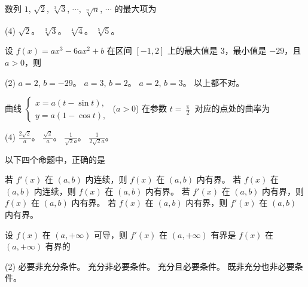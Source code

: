 \begin{ti}
	数列 $1$, $\sqrt{2}$, $\sqrt[3]{3}$, $\cdots$, $\sqrt[n]{n}$, $\cdots$ 的最大项为
	\begin{tasks}(4)
		\task $\sqrt{2}$。
		\task $\sqrt[3]{3}$。
		\task $\sqrt[4]{4}$。
		\task $\sqrt[5]{5}$。
	\end{tasks}
\end{ti}

\begin{ti}
	设 $f(x) = ax^3 - 6ax^2 + b$ 在区间 $[-1,2]$ 上的最大值是 $3$，最小值是 $-29$，且 $a>0$，则
	\begin{tasks}(2)
		\task $a=2$, $b=-29$。
		\task $a=3$, $b=2$。
		\task $a=2$, $b=3$。
		\task 以上都不对。
	\end{tasks}
\end{ti}

\begin{ti}
	曲线 $\begin{cases}
		x = a(t - \sin t), \\
		y = a(1 - \cos t),
	\end{cases}$ ($a > 0$) 在参数 $t = \frac{\uppi}{2}$ 对应的点处的曲率为
	\begin{tasks}(4)
		\task $\frac{2\sqrt{2}}{a}$。
		\task $\frac{\sqrt{2}}{a}$。
		\task $\frac{1}{\sqrt{2}a}$。
		\task $\frac{1}{2\sqrt{2}a}$。
	\end{tasks}
\end{ti}

\begin{ti}
	以下四个命题中，正确的是
	\begin{tasks}
		\task 若 $f'(x)$ 在 $(a,b)$ 内连续，则 $f(x)$ 在 $(a,b)$ 内有界。
		\task 若 $f(x)$ 在 $(a,b)$ 内连续，则 $f(x)$ 在 $(a,b)$ 内有界。
		\task 若 $f'(x)$ 在 $(a,b)$ 内有界，则 $f(x)$ 在 $(a,b)$ 内有界。
		\task 若 $f(x)$ 在 $(a,b)$ 内有界，则 $f'(x)$ 在 $(a,b)$ 内有界。
	\end{tasks}
\end{ti}

\begin{ti}
	设 $f(x)$ 在 $(a,+\infty)$ 可导，则 $f'(x)$ 在 $(a,+\infty)$ 有界是 $f(x)$ 在 $(a,+\infty)$ 有界的
	\begin{tasks}(2)
		\task 必要非充分条件。
		\task 充分非必要条件。
		\task 充分且必要条件。
		\task 既非充分也非必要条件。
	\end{tasks}
\end{ti}

